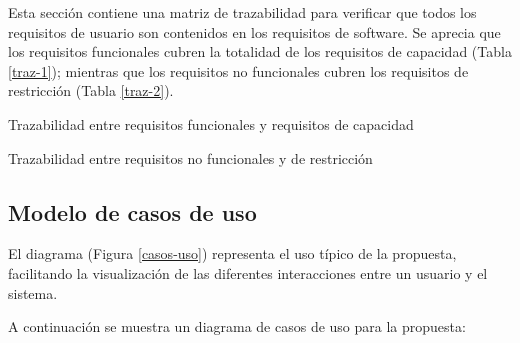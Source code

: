 Esta sección contiene una matriz de trazabilidad para verificar que todos los requisitos de usuario son contenidos en los requisitos de software. Se aprecia que los requisitos funcionales cubren la totalidad de los requisitos de capacidad (Tabla \ref{traz-1}); mientras que los requisitos no funcionales cubren los requisitos de restricción (Tabla \ref{traz-2}).

\begin{table}[H]
    \traceabilityFNCA
    \caption{Trazabilidad entre requisitos funcionales y requisitos de capacidad}
    \label{traz-1}
\end{table}

\begin{table}[H]
    \traceabilityNFRE
    \caption{Trazabilidad entre requisitos no funcionales y de restricción}
    \label{traz-2}
\end{table}

\subsection{Modelo de casos de uso}\label{subsec:use-cases}

El diagrama (Figura \ref{casos-uso}) representa el uso típico de la propuesta, facilitando la visualización de las diferentes interacciones entre un usuario y el sistema. 

\printuctemplate{}

A continuación se muestra un diagrama de casos de uso para la propuesta:

